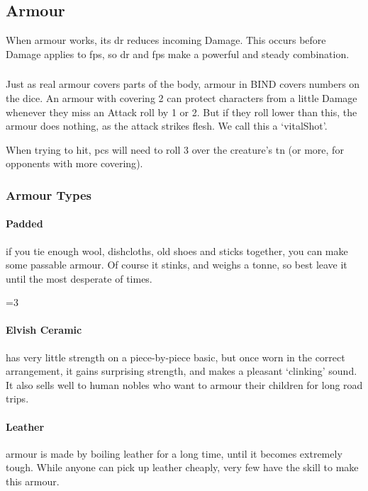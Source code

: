 \begin{multicols}{2}
\subsection{Armour}



When armour works, its \gls{dr} reduces incoming Damage.
This occurs before Damage applies to \glspl{fp}, so \gls{dr} and \glspl{fp} make a powerful and steady combination.

\subsubsection{}
\label{vitals}
Just as real armour covers parts of the body, armour in BIND covers numbers on the dice.
An armour with \gls{covering} 2 can protect characters from a little Damage whenever they miss an Attack roll by 1 or 2.
But if they roll lower than this, the armour does nothing, as the attack strikes flesh.
We call this a `\gls{vitalShot}'.

When trying to hit, \glspl{pc} will need to roll 3 over the creature's \gls{tn} (or more, for opponents with more \gls{covering}).

\armourchart

\noindent
\subsubsection{Armour Types}

\paragraph{Padded}
if you tie enough wool, dishcloths, old shoes and sticks together, you can make some passable armour.
Of course it stinks, and weighs a tonne, so best leave it until the most desperate of times.

\ifnum\value{r4}=3
  \paragraph{Elvish Ceramic}
  has very little strength on a piece-by-piece basic, but once worn in the correct arrangement, it gains surprising strength, and makes a pleasant `clinking' sound.
  It also sells well to human nobles who want to armour their children for long road trips. 
\fi

\paragraph{Leather}
armour is made by boiling leather for a long time, until it becomes extremely tough.
While anyone can pick up leather cheaply, very few have the skill to make this armour.


\end{multicols}
